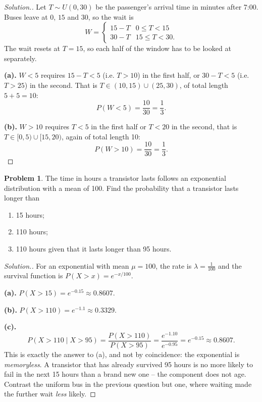\documentclass[12pt,a4paper]{report}
\theoremstyle{definition}
\theoremstyle{plain}
\theoremstyle{definition}
\newtheorem{problemx}{Problem}[section]
\newenvironment{problem}{\begin{problemx}}{\end{problemx}}
\newenvironment{solution}
  {\renewcommand{\qedsymbol}{}\begin{proof}[\textit{Solution}.]}
  {\end{proof}}
\begin{document}
\begin{solution}
Let $T\sim U(0,30)$ be the passenger's arrival time in minutes after 7:00. Buses leave at
$0$, $15$ and $30$, so the wait is
\[W = \begin{cases} 15-T & 0\leq T<15\\ 30-T & 15\leq T<30.\end{cases}\]
The wait resets at $T=15$, so each half of the window has to be looked at separately.

\textbf{(a).} $W<5$ requires $15-T<5$ (i.e. $T>10$) in the first half, or $30-T<5$
(i.e. $T>25$) in the second. That is $T\in(10,15)\cup(25,30)$, of total length
$5+5 = 10$:
\[P(W<5) = \frac{10}{30} = \frac{1}{3}.\]

\textbf{(b).} $W>10$ requires $T<5$ in the first half or $T<20$ in the second, that is
$T\in[0,5)\cup[15,20)$, again of total length 10:
\[P(W>10) = \frac{10}{30} = \frac{1}{3}.\]
\end{solution}

\begin{problem}
The time in hours a transistor lasts follows an exponential distribution with a mean of
100. Find the probability that a transistor lasts longer than
\begin{enumerate}
\item[(a).] 15 hours;
\item[(b).] 110 hours;
\item[(c).] 110 hours given that it lasts longer than 95 hours.
\end{enumerate}
\end{problem}

\begin{solution}
For an exponential with mean $\mu = 100$, the rate is $\lambda = \tfrac{1}{100}$ and the
survival function is $P(X>x) = e^{-x/100}$.

\textbf{(a).} $P(X>15) = e^{-0.15} \approx 0.8607$.

\textbf{(b).} $P(X>110) = e^{-1.1} \approx 0.3329$.

\textbf{(c).} \[P(X>110\mid X>95) = \frac{P(X>110)}{P(X>95)} = \frac{e^{-1.10}}{e^{-0.95}}
 = e^{-0.15} \approx 0.8607.\]
This is exactly the answer to (a), and not by coincidence: the exponential is
\emph{memoryless}. A transistor that has already survived 95 hours is no more likely to
fail in the next 15 hours than a brand new one -- the component does not age. Contrast the
uniform bus in the previous question but one, where waiting made the further wait
\emph{less} likely.
\end{solution}
\end{document}
